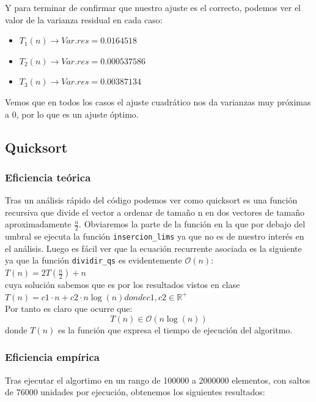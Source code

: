 \documentclass[10pt,a4paper]{article}
\begin{document}
Y para terminar de confirmar que nuestro ajuste es el correcto, podemos ver el valor de la varianza residual en cada caso:

\begin{itemize}
	\item \(T_1(n) \longrightarrow Var.res = 0.0164518\)
	\item \(T_2(n) \longrightarrow Var.res = 0.000537586\)
	\item \(T_3(n) \longrightarrow Var.res = 0.00387134\)
\end{itemize}

Vemos que en todos los casos el ajuste cuadrático nos da varianzas muy próximas a 0, por lo que es un ajuste óptimo.

\subsection{Quicksort}

\subsubsection{Eficiencia teórica}
Tras un análisis rápido del código podemos ver como quicksort es una función recursiva que divide el vector a ordenar de tamaño n en dos vectores de tamaño aproximadamente \(\frac{n}{2}\). Obviaremos la parte de la función en la que por debajo del umbral se ejecuta la función \texttt{insercion\_lims} ya que no es de nuestro interés en el análisis. Luego es fácil ver que la ecuación recurrente asociada es la siguiente ya que la función \texttt{dividir\_qs} es evidentemente \(\mathcal{O}(n)\):
\\
\(T(n) = 2T(\frac{n}{2}) + n \)
\\
cuya solución sabemos que es por los resultados vistos en clase 
\\
\(T(n) = c1 \cdot n + c2 \cdot n\log(n) donde c1, c2 \in \mathbb{R^+} \)
\\
Por tanto es claro que ocurre que:
\[
T(n) \in \mathcal{O}(n\log(n))
\]
donde \(T(n)\) es la función que expresa el tiempo de ejecución del algoritmo.

\subsubsection{Eficiencia empírica}
Tras ejecutar el algortimo en un rango de 100000 a 2000000 elementos, con saltos de 76000 unidades por ejecución, obtenemos los siguientes resultados:
\end{document}
